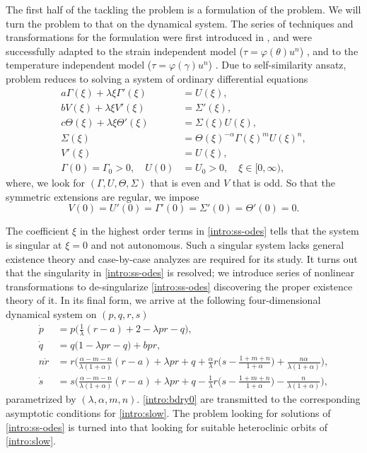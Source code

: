 \documentclass[a4paper,11pt]{article}
\theoremstyle{remark}
\begin{document}
The first half of the tackling the problem is a formulation of the problem. We will turn the problem to that on the dynamical system. The series of techniques and transformations for the formulation were first introduced in \cite{KOT14}, and were successfully adapted to the strain independent model ($\tau=\varphi(\theta)u^n$) \cite{KLT_HYP2016}, and to the temperature independent model ($\tau=\varphi(\gamma)u^n$) \cite{LT16,KLT_2016}. Due to self-similarity ansatz, problem reduces to solving a system of ordinary differential equations
\begin{equation} \label{intro:ss-odes}
\begin{aligned}
 a \Gamma(\xi) + \lambda \xi \Gamma'(\xi) &= U(\xi), \\
 b V(\xi) + \lambda \xi V'(\xi) &= \Sigma'(\xi), \\
 c \Theta(\xi) + \lambda \xi \Theta'(\xi)&=\Sigma(\xi) U(\xi),\\
 \Sigma(\xi) &= \Theta(\xi)^{-\alpha} \Gamma(\xi)^m U(\xi)^n, \\
 V'(\xi)&=U(\xi),\\
 \Gamma(0)=\Gamma_0>0, \quad U(0)&=U_0>0, \quad \text{$\xi \in [0,\infty)$},
\end{aligned}
\end{equation}
where, we look for $(\Gamma,U,\Theta,\Sigma)$ that is even and $V$ that is odd. So that the symmetric extensions are regular, we impose
\begin{equation}
 V(0)=U'(0)=\Gamma'(0)=\Sigma'(0)=\Theta'(0)=0. \label{intro:bdry0}
\end{equation}

The coefficient $\xi$ in the highest order terms in \eqref{intro:ss-odes} tells that the system is  singular at $\xi=0$ and not autonomous. Such a singular system lacks general existence theory and case-by-case analyzes are required for its study. It turns out that the singularity in \eqref{intro:ss-odes} is resolved; we introduce series of nonlinear transformations to de-singularize \eqref{intro:ss-odes} discovering the proper existence theory of it. In its final form, we arrive at the following four-dimensional dynamical system on $(p,q,r,s)$
\begin{equation}\label{intro:slow}
 \begin{aligned}
 \dot{p} &=p\Big(\frac{1}{\lambda}(r-a) + 2- \lambda p r -q\Big), \\
 \dot{q} &=q\Big(1 -\lambda p r -q\Big) + b p r,\\
 n\dot{r} &=r\Big(\frac{\alpha-m-n}{\lambda(1+\alpha)}(r-a) + \lambda pr + q +\frac{\alpha}{\lambda}r\big(s- \frac{1+m+n}{1+\alpha}\big) + \frac{n\alpha}{\lambda(1+\alpha)}\Big),\\
 \dot{s} &=s\Big(\frac{\alpha-m-n}{\lambda(1+\alpha)}(r-a) + \lambda pr + q - \frac{1}{\lambda}r\big(s- \frac{1+m+n}{1+\alpha}\big) - \frac{n}{\lambda(1+\alpha)}\Big),
 \end{aligned}
\end{equation}
parametrized by $(\lambda,\alpha,m,n)$. \eqref{intro:bdry0} are transmitted to the corresponding asymptotic conditions for \eqref{intro:slow}. The problem looking for solutions of \eqref{intro:ss-odes} is turned into that looking for suitable heteroclinic orbits of \eqref{intro:slow}.
\end{document}

